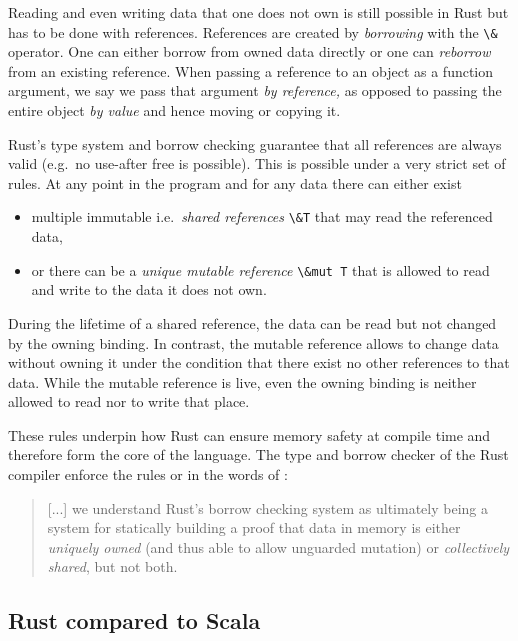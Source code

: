 Reading and even writing data that one does not own is still possible in
Rust but has to be done with references. References are created by
\emph{borrowing} with the \passthrough{\lstinline!\&!} operator. One can
either borrow from owned data directly or one can \emph{reborrow} from
an existing reference. When passing a reference to an object as a
function argument, we say we pass that argument \emph{by reference,} as
opposed to passing the entire object \emph{by value} and hence moving or
copying it.

Rust's type system and borrow checking guarantee that all references are
always valid (e.g.~no use-after free is possible). This is possible
under a very strict set of rules. At any point in the program and for
any data there can either exist

\begin{itemize}
\tightlist
\item
  multiple immutable i.e.~\emph{shared references}
  \passthrough{\lstinline!\&T!} that may read the referenced data,
\item
  or there can be a \emph{unique mutable reference}
  \passthrough{\lstinline!\&mut T!} that is allowed to read and write
  to the data it does not own.
\end{itemize}

During the lifetime of a shared reference, the data can be read but not
changed by the owning binding. In contrast, the mutable reference allows
to change data without owning it under the condition that there exist no
other references to that data. While the mutable reference is live, even
the owning binding is neither allowed to read nor to write that place.

These rules underpin how Rust can ensure memory safety at compile time
and therefore form the core of the language. The type and borrow checker
of the Rust compiler enforce the rules or in the words of \citet{oxide}:

\begin{quote}
{[...]} we understand Rust's borrow checking system as ultimately being a system
for statically building a proof that data in memory is either
\emph{uniquely owned} (and thus able to allow unguarded mutation) or
\emph{collectively shared}, but not both.
\end{quote}

\subsection{Rust compared to Scala}

